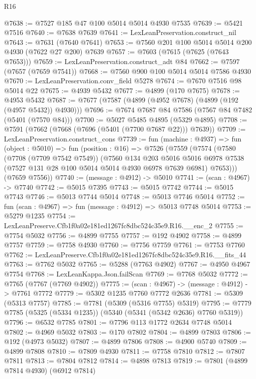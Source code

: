\begin{lexlean}{R16}
\begin{coremodule}
@7638 := @7527 @185 @47 @100 @5014 @5014 @4930 @7535
@7639 := @5421 @7516
@7640 := @7638 @7639
@7641 := LexLeanPreservation.construct_nil
@7643 := @7631 (@7640 @7641)
@7653 := @7560 @201 @100 @5014 @5014 @200 @4930 (@7622 @27 @200) @7639
@7657 := @7603 (@7615 (@7625 (@7643 @7653)))
@7659 := LexLeanPreservation.construct_adt @84
@7662 := @7597 (@7657 (@7659 @7541))
@7668 := @7560 @900 @100 @5014 @5014 @7586 @4930
@7670 := LexLeanPreservation.conv_field @5278
@7674 := @7670 @7516 @98 @5014 @22
@7675 := @4939 @5432
@7677 := @4899 (@170 @7675)
@7678 := @4953 @5432
@7687 := @7677 (@7587 (@4899 (@4952 @7678) (@4899 (@192 (@4957 @5432)) @4930)))
@7696 := @7674 @7687 @84 @7586 (@7567 @84 @7482 (@5401 (@7570 @84)))
@7700 := @5027 @5485 @4895 (@5329 @4895)
@7708 := @7591 (@7662 (@7668 (@7696 (@5401 (@7700 @7687 @22))) @7639))
@7709 := LexLeanPreservation.construct_cons
@7739 := fun (machine : @4937) =>
  fun (object : @5010) =>
  fun (position : @16) =>
  @7526
    (@7559
      (@7574
        (@7580
          (@7708 (@7709 @7542 @7549))
          (@7560
            @134
            @203
            @5016
            @5016
            @6978
            @7538
            (@7527 @131 @28 @100 @5014 @5014 @4930 @6978 @7639 @6981)
            @7653)))
      (@7659 @7556))
@7740 := (message : @4912) -> @5010
@7741 := (scan : @4967) -> @7740
@7742 := @5015 @7395
@7743 := @5015 @7742
@7744 := @5015 @7743
@7746 := @5013 @7744 @5014
@7748 := @5013 @7746 @5014
@7752 := fun (scan : @4967) => fun (message : @4912) => @5013 @7748 @5014
@7753 := @5279 @1235
@7754 := LexLeanPreserve.Cfb1f0a02e181ed1267fc8dbc524c35e9.R16.__enc_2
@7755 := @7754 @5032
@7756 := @4899 @7755
@7757 := @192 @4902
@7758 := @4899 @7757
@7759 := @7758 @4930
@7760 := @7756 @7759
@7761 := @7753 @7760
@7762 := LexLeanPreserve.Cfb1f0a02e181ed1267fc8dbc524c35e9.R16.__fits_44
@7763 := @7762 @5032
@7765 := @5288 (@7763 @4902)
@7767 := @4950 @4967 @7754
@7768 := LexLeanKappa.Json.failScan
@7769 := @7768 @5032
@7772 := @7765 (@7767 (@7769 @4902))
@7775 := (scan : @4967) -> (message : @4912) -> @7761 @7772
@7779 := @5302 @1235 @7760 @7772 @2636
@7781 := @5309 (@5313 @7757)
@7785 := @7781 (@5309 (@5316 @7755) @5319)
@7795 := @7779 @7785 (@5325 (@5334 @1235)) (@5340 (@5341 (@5342 @2636) @7760 @5319))
@7796 := @6532 @7785
@7801 := @7796 @113 @1772 @2634 @7748 @5014
@7802 := @4969 @5032
@7803 := @170 @7802
@7804 := @4899 @7803
@7806 := @192 (@4973 @5032)
@7807 := @4899 @7806
@7808 := @4900 @5740
@7809 := @4899 @7808
@7810 := @7809 @4930
@7811 := @7758 @7810
@7812 := @7807 @7811
@7813 := @7804 @7812
@7814 := @4898 @7813
@7819 := @7801 (@4899 @7814 @4930) (@6912 @7814)

\end{coremodule}
\end{lexlean}
